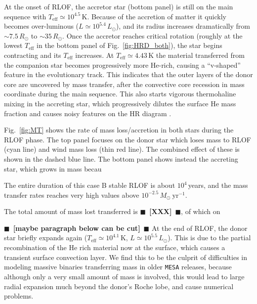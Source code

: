 \documentclass[twocolumn,twocolappendix,trackchanges]{aastex63}
\DeclareRobustCommand{\Figref}[1]{Fig.~\ref{#1}}
\newcommand{\todo}[1]{{\large $\blacksquare$~\textbf{\color{red}[#1]}}~$\blacksquare$}
\begin{document}
At the onset of RLOF, the accretor star (bottom panel) is still on the
main sequence with $T_\mathrm{eff}\simeq10^{4.5}$\,K. Because of the
accretion of matter it quickly becomes over-luminous
($L\simeq10^{5.4}\,L_\odot$), and its radius increases dramatically
from $\sim7.5\,R_\odot$ to $\sim35\,R_\odot$. Once the accretor
reaches critical rotation (roughly at the lowest $T_\mathrm{eff}$ in
the bottom panel of \Figref{fig:HRD_both}), the star begins
contracting and its $T_\mathrm{eff}$ increases. At
$T_\mathrm{eff}\simeq 4.{43}$\,K the material transferred from the
companion star becomes progressively more He-rich, causing a
``v-shaped'' feature in the evolutionary track. This indicates that
the outer layers of the donor core are uncovered by mass transfer,
after the convective core recession in mass coordinate during the main
sequence. This also starts vigorous thermohaline mixing in the
accreting star, which progressively dilutes the surface He mass
fraction and causes noisy features on the HR diagram
\citep[e.g.,][]{cantiello:07}.


\Figref{fig:MT} shows the rate of mass loss/accretion in both stars
during the RLOF phase. The top panel focuses on the donor star
which loses mass to RLOF (cyan line) and wind mass loss (thin red
line). The combined effect of these is shown in the dashed blue line.
The bottom panel shows instead the accreting star, which grows in mass becau


The entire duration of this case B stable RLOF
is about $10^4$\,years, and the mass transfer rates reaches very high
values above $10^{-2.5}\,M_\odot\ \mathrm{yr^{-1}}$.



The total amount
of mass lost transferred is \todo{XXX}, of which on

\todo{maybe paragraph below can be cut}
At the end of RLOF, the donor star briefly expands again
($T_\mathrm{eff}\simeq10^{4.1}$\,K, $L\simeq10^{5.5}\,L_\odot$). This
is due to the partial recombination of the He rich material now at the
surface, which causes a transient surface convection layer. We find
this to be the culprit of difficulties in modeling massive binaries
transferring mass in older \texttt{MESA} releases, because although
only a very small amount of mass is involved, this would lead to large
radial expansion much beyond the donor's Roche lobe, and cause
numerical problems.
\end{document}
